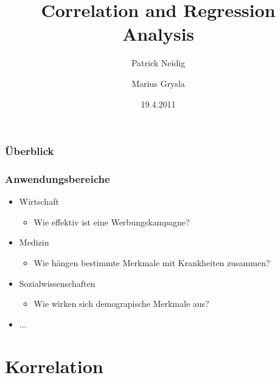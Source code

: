 \documentclass{beamer}
\begin{document}
\title{Correlation and Regression Analysis}
\author{Patrick Neidig \and Marius Grysla}
\date{19.4.2011}
\frame{\titlepage}

\begin{frame}
 \frametitle{\"Uberblick}
 \tableofcontents
\end{frame}

\begin{frame}
 \frametitle{Anwendungsbereiche}

 \begin{itemize}
  \item Wirtschaft
  \begin{itemize}
   \item Wie effektiv ist eine Werbungskampagne?
  \end{itemize}

  \item Medizin
  \begin{itemize}
   \item Wie h\"angen bestimmte Merkmale mit Krankheiten zusammen?
  \end{itemize}

\item Sozialwissenschaften
  \begin{itemize}
   \item Wie wirken sich demograpische Merkmale aus?
  \end{itemize}

\item ...

 \end{itemize}

\end{frame}


\section{Korrelation}
\end{document}
